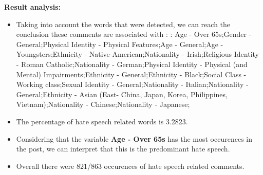\documentclass[11pt]{article}
\begin{document}
\textbf{\Large Result analysis:}

\begin{itemize}\item Taking into account the words that were detected, we can reach the conclusion these comments are associated with : : Age - Over 65s;Gender - General;Physical Identity - Physical Features;Age - General;Age - Youngsters;Ethnicity - Native-American;Nationality - Irish;Religious Identity - Roman Catholic;Nationality - German;Physical Identity - Physical (and Mental) Impairments;Ethnicity - General;Ethnicity - Black;Social Class - Working class;Sexual Identity - General;Nationality - Italian;Nationality - General;Ethnicity - Asian (East- China, Japan, Korea, Philippines, Vietnam);Nationality - Chinese;Nationality - Japanese;%

\item The percentage of hate speech related words is 3.2823.

\item Considering that the variable \textbf{Age - Over 65s} has the most occurences in the post, we can interpret that this is the predominant hate speech.

\item Overall there were 821/863 occurences of hate speech related comments.\end{itemize}
\end{document}
